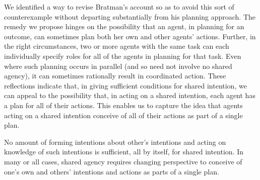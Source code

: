 \documentclass[12pt,\papersize]{extarticle}
\begin{document}
We identified a way to revise Bratman's account so as to avoid this sort of counterexample without departing substantially from his planning approach.
The remedy we propose hinges on the possibility that an agent, in planning for an outcome, can sometimes plan both her own and other agents' actions.
Further, in the right circumstances,
two or more agents with the same task
	can each individually specify roles for all of the agents in planning for that task.
Even where such planning occurs in parallel (and so need not involve no shared agency),  it can sometimes rationally result in coordinated action.
These reflections indicate that, in giving sufficient conditions for shared intention, we can appeal to the possibility that, in acting on a shared intention, each agent has a plan for all of their actions.
This enables us to capture the idea that agents acting on a shared intention conceive of all of their actions as part of a single plan.

No amount of forming intentions about other's intentions and acting on knowledge of such intentions is sufficient, all by itself, for shared intention.  
In many or all cases, shared agency requires changing perspective 
to conceive of one's own and others' intentions and actions as parts of a single plan.



\end{document}
